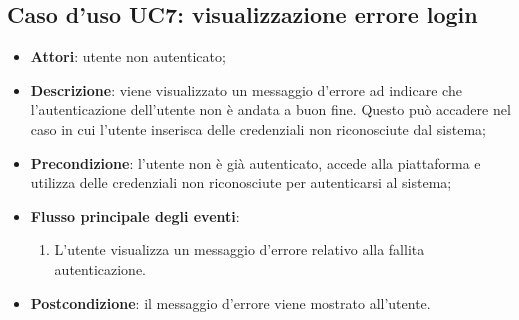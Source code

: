 \hypertarget{UC7}{}
\subsection{Caso d'uso UC7: visualizzazione errore login}
\begin{itemize}
\item \textbf{Attori}: utente non autenticato;
\item \textbf{Descrizione}: viene visualizzato un messaggio d'errore ad indicare che l'autenticazione dell'utente non è andata a buon fine. Questo può accadere nel caso in cui l'utente inserisca delle credenziali non riconosciute dal sistema; 
      \item \textbf{Precondizione}: l'utente non è già autenticato, accede alla piattaforma e utilizza delle credenziali non riconosciute per autenticarsi al sistema;

        \item \textbf{Flusso principale degli eventi}:
          \begin{enumerate}
          \item L'utente visualizza un messaggio d'errore relativo alla fallita autenticazione.

      \end{enumerate}
    \item \textbf{Postcondizione}: il messaggio d'errore viene mostrato all'utente.
  \end{itemize}
 

